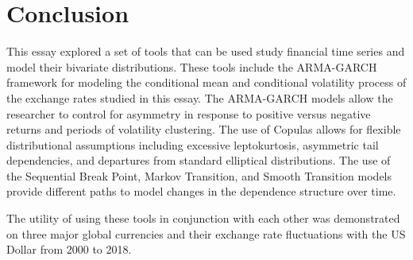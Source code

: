 \documentclass[12pt]{article}
\begin{document}
\section{Conclusion} \label{sec:Conclusion}

This essay explored a set of tools that can be used study financial time series and model their bivariate distributions. These tools include the ARMA-GARCH framework for modeling the conditional mean and conditional volatility process of the exchange rates studied in this essay. The ARMA-GARCH models allow the researcher to control for asymmetry in response to positive versus negative returns and periods of volatility clustering. The use of Copulas allows for flexible distributional assumptions including excessive leptokurtosis, asymmetric tail dependencies, and departures from standard elliptical distributions. The use of the Sequential Break Point, Markov Transition, and Smooth Transition models provide different paths to model changes in the dependence structure over time. 

The utility of using these tools in conjunction with each other was demonstrated on three major global currencies and their exchange rate fluctuations with the US Dollar from 2000 to 2018.
\end{document}
